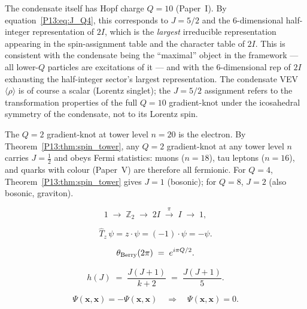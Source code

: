 \begin{remark}[The $Q=10$ condensate and its spin representation]
\label{P13:rem:condensate_q10}
The condensate itself has Hopf charge $Q=10$ (Paper~I).
By equation~\eqref{P13:eq:J_Q4}, this corresponds to $J=5/2$ and the
$6$-dimensional half-integer representation of $2I$, which is
the \emph{largest} irreducible representation appearing in
the spin-assignment table and the character table of $2I$.
This is consistent with the condensate being the ``maximal'' object
in the framework --- all lower-$Q$ particles are excitations of it ---
and with the $6$-dimensional rep of $2I$ exhausting the half-integer
sector's largest representation.
The condensate VEV $\langle\rho\rangle$ is of course a scalar
(Lorentz singlet); the $J=5/2$ assignment refers to the transformation
properties of the full $Q=10$ gradient-knot under the icosahedral
symmetry of the condensate, not to its Lorentz spin.
\end{remark}

\begin{remark}
\label{P13:rem:scope_fermi}
The $Q=2$ gradient-knot at tower level $n=20$ is the electron.
By Theorem~\ref{P13:thm:spin_tower}, any $Q=2$ gradient-knot at any
tower level $n$ carries $J=\tfrac{1}{2}$ and obeys Fermi statistics:
muons ($n=18$), tau leptons ($n=16$), and quarks with colour
(Paper~V) are therefore all fermionic.
For $Q=4$, Theorem~\ref{P13:thm:spin_tower} gives $J=1$ (bosonic);
for $Q=8$, $J=2$ (also bosonic, graviton).
\end{remark}

\begin{equation}
  1 \;\longrightarrow\; \mathbb{Z}_2
  \;\longrightarrow\; 2I
  \;\stackrel{\pi}{\longrightarrow}\; I
  \;\longrightarrow\; 1,
  \label{P13:eq:2I_exact_seq}
\end{equation}

\begin{equation}
  \hat{T}_z \,\psi = z\cdot\psi = (-1)\cdot\psi = -\psi.
  \label{P13:eq:z_action}
\end{equation}

\begin{equation}
  \theta_{\rm Berry}(2\pi) \;=\; e^{i\pi Q/2}.
  \label{P13:eq:berry_general}
\end{equation}

\begin{equation}
  h(J) \;=\; \frac{J(J+1)}{k+2} \;=\; \frac{J(J+1)}{5}.
  \label{P13:eq:conformal_weight}
\end{equation}

\begin{equation}
  \Psi(\mathbf{x},\mathbf{x}) = -\Psi(\mathbf{x},\mathbf{x})
  \quad\Longrightarrow\quad
  \Psi(\mathbf{x},\mathbf{x}) = 0.
  \label{P13:eq:pauli_zero}
\end{equation}
